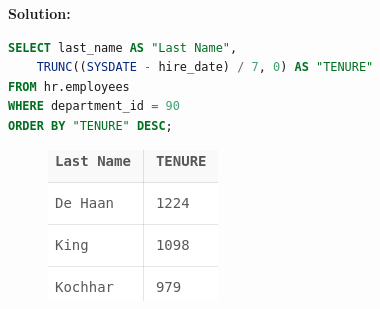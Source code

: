 \documentclass[a4paper,12pt]{article}
\begin{document}
\begin{enumerate}
\textbf{Solution: }
        \begin{lstlisting}[language=SQL, label={lst:employees_data}]
SELECT last_name AS "Last Name",
    TRUNC((SYSDATE - hire_date) / 7, 0) AS "TENURE"
FROM hr.employees
WHERE department_id = 90
ORDER BY "TENURE" DESC;
    \end{lstlisting}
        \begin{figure}[h]
        \centering
        \includegraphics*[width=.25\linewidth]{graphics/39.1.png}
    \end{figure}
\end{enumerate}
\end{document}
